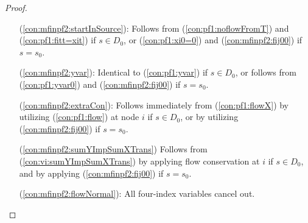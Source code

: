 \begin{proof}
\begin{itemize}[leftmargin=1cm]
	Assume first that (L.4a) holds.
	We have that $\exists t\in D_0 \text{ s. t. }F^t_{ij}=g_{ij}$.
	Besides the strict inequality, assumption (\ref{eq:assumContr}) also implies $g_{ij}> 0$ which together with Lemma \ref{lem:onedir} gives $F^t_{ji}=0$.
 	By applying (\ref{con:pf1:xfrel}) to arcs entering $i$,
	$$\sum\limits_{k\in V_i}F^t_{ik} \geq F^t_{ij}=g_{ij}>\sum\limits_{k \in V_i\setminus\{j\}}g_{ki} \geq \sum\limits_{k \in V_i\setminus\{j\}}F^t_{ki}=\sum\limits_{k \in V_i}F^t_{ki},$$
	contradicting flow conservation constraints (\ref{con:pf1:flow}).
	Assume next that (L.4a) does not hold, i.e., $F^*_{ij}<g_{ij}$. 
	We know from Lemma \ref{lem:oneslack} that $g_{ji}=F^*_{ji}$, and so $\exists t\in D_0 \text{ s. t. }F^t_{ji}=g_{ji}$. 
	Moreover, Lemma \ref{lem:onedir} says that if for some $s\in D_0: F^s_{ji}>0$, then $F^s_{ij} = 0$, i.e. any flow that enters $i$ via $(j,i)$ must leave it through an arc different from $(i,j)$.
	Together with the flow conservation and (\ref{con:pf1:xfrel}),
	$$
	g_{ji}=F^t_{ji}\leq\sum_{k\in V_i}F^t_{ik}=\sum_{k\in V_i\setminus\{j\}}F^t_{ik}\leq\sum_{k\in V_i\setminus\{j\}}g_{ik}.
	$$
	Note that for $g_{ji}=F^t_{ji}=0$, $F^t_{ij}\geq 0$ in which case the second equality above would not hold, but we could directly write $g_{ji}\leq\sum_{k\in V_i\setminus\{j\}}g_{ik}$. 
	Combined with the assumption (\ref{eq:assumContr}) we obtain
	$$
	\sum_{k\in V_i}g_{ki} = g_{ji} + \sum_{k\in V_i\setminus\{j\}}g_{ki}<g_{ij} + \sum_{k\in V_i\setminus\{j\}}g_{ik} = \sum_{k\in V_i}g_{ik},
	$$
	contradicting (L.4b), and thereby Lemma \ref{lem:xequals}. 
	The proof applies with minor simplifications also for $s=s_0$.
\item[ (\ref{con:mfinpf2:startInSource}):] Follows from (\ref{con:pf1:noflowFromT}) and (\ref{con:pf1:fitt=xit}) if $s\in D_0$, or (\ref{con:pf1:xi0=0}) and (\ref{con:mfinpf2:fij00}) if $s=s_0$.
\item[ (\ref{con:mfinpf2:yvar}):] Identical to (\ref{con:pf1:yvar}) if $s\in D_0$, or follows from (\ref{con:pf1:yvar0}) and (\ref{con:mfinpf2:fij00}) if $s=s_0$.
\item[ (\ref{con:mfinpf2:extraCon}):] Follows immediately from (\ref{con:pf1:flowX}) by utilizing (\ref{con:pf1:flow}) at node $i$ if $s\in D_0$, or by utilizing (\ref{con:mfinpf2:fij00}) if $s=s_0$.
\item[(\ref{con:mfinpf2:sumYImpSumXTrans})] Follows from (\ref{con:vi:sumYImpSumXTrans}) by applying flow conservation at $i$ if $s\in D_0$, and by applying (\ref{con:mfinpf2:fij00}) if $s=s_0$. 
\item[(\ref{con:mfinpf2:flowNormal}):] All four-index variables cancel out. 

\end{itemize}
\end{proof}
